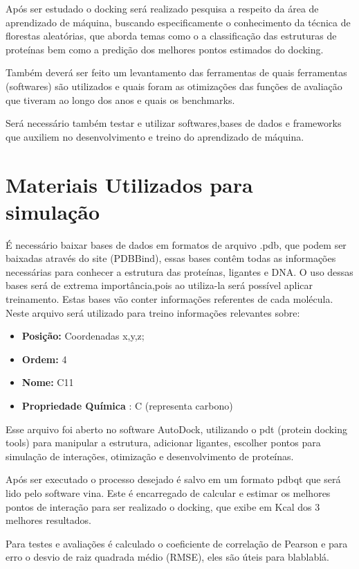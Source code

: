 \documentclass[tcc, capa]{texucpel}
\begin{document}
Após ser estudado o docking será realizado pesquisa a respeito da área de aprendizado de máquina, buscando especificamente o conhecimento da técnica de florestas aleatórias, que aborda temas como o a classificação das estruturas de proteínas bem como a predição dos melhores pontos estimados do docking.

Também deverá ser feito um levantamento das ferramentas de quais ferramentas (softwares) são utilizados e quais foram as otimizações das funções de avaliação que tiveram ao longo dos anos e quais os benchmarks.

Será necessário também testar e utilizar softwares,bases de dados e  frameworks que auxiliem no desenvolvimento e treino do aprendizado de máquina.

\section{Materiais Utilizados para simulação}
É necessário baixar bases de dados em formatos de arquivo .pdb, que podem ser baixadas através do site (PDBBind), essas bases contêm todas as informações necessárias para conhecer a estrutura das proteínas, ligantes e DNA. 
O uso dessas bases será de extrema importância,pois ao utiliza-la será possível aplicar treinamento. 
Estas bases vão conter informações referentes de cada molécula. Neste arquivo será utilizado para treino informações relevantes sobre: 
\begin{itemize}

\item \textbf{Posição:} Coordenadas x,y,z;
\item \textbf{Ordem:} 4
\item \textbf{Nome:} C11
\item \textbf{Propriedade Química} : C (representa carbono)

\end{itemize}

Esse arquivo foi aberto no software AutoDock, utilizando o pdt (protein docking tools) para manipular a estrutura, adicionar ligantes, escolher pontos para simulação de interações, otimização e desenvolvimento de proteínas. 

Após ser executado o processo desejado é salvo em um formato pdbqt que será lido pelo software vina. Este é encarregado de calcular e estimar os melhores pontos de interação para ser realizado o docking, que exibe em Kcal dos 3 melhores resultados.

Para testes e avaliações é calculado o coeficiente de correlação de Pearson e para erro o desvio de raiz quadrada médio (RMSE), eles são úteis para blablablá. 
\end{document}
